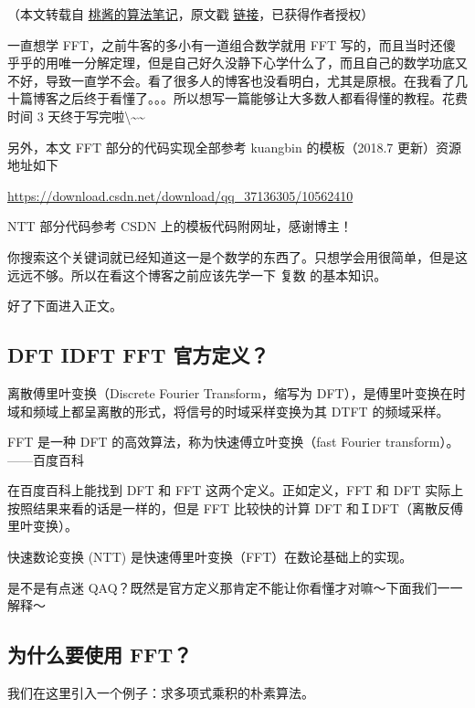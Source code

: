 
（本文转载自 \href{https://zhuanlan.zhihu.com/c_1005817911142838272}{桃酱的算法笔记}，原文戳 \href{https://zhuanlan.zhihu.com/p/41867199}{链接}，已获得作者授权）

一直想学 FFT，之前牛客的多小有一道组合数学就用 FFT 写的，而且当时还傻乎乎的用唯一分解定理，但是自己好久没静下心学什么了，而且自己的数学功底又不好，导致一直学不会。看了很多人的博客也没看明白，尤其是原根。在我看了几十篇博客之后终于看懂了。。。所以想写一篇能够让大多数人都看得懂的教程。花费时间 3 天终于写完啦\sout{}\textbackslash{}\textasciitilde{}\textasciitilde{}

另外，本文 FFT 部分的代码实现全部参考 kuangbin 的模板（2018.7 更新）资源地址如下

\url{https://download.csdn.net/download/qq_37136305/10562410}

NTT 部分代码参考 CSDN 上的模板代码附网址，感谢博主！

你搜索这个关键词就已经知道这一是个数学的东西了。只想学会用很简单，但是这远远不够。所以在看这个博客之前应该先学一下  复数  的基本知识。

好了下面进入正文。

\subsection{DFT IDFT FFT 官方定义？}

\begin{QUOTE}{}{}
离散傅里叶变换（Discrete Fourier Transform，缩写为 DFT），是傅里叶变换在时域和频域上都呈离散的形式，将信号的时域采样变换为其 DTFT 的频域采样。



FFT 是一种 DFT 的高效算法，称为快速傅立叶变换（fast Fourier transform）。 ——百度百科
\end{QUOTE}

在百度百科上能找到 DFT 和 FFT 这两个定义。正如定义，FFT 和 DFT 实际上按照结果来看的话是一样的，但是 FFT 比较快的计算 DFT 和ＩDFT（离散反傅里叶变换）。

快速数论变换 (NTT) 是快速傅里叶变换（FFT）在数论基础上的实现。

是不是有点迷 QAQ？既然是官方定义那肯定不能让你看懂才对嘛～下面我们一一解释～

\subsection{为什么要使用 FFT？}

我们在这里引入一个例子：求多项式乘积的朴素算法。

